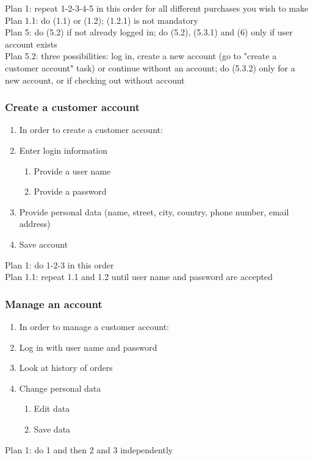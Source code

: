 Plan 1: repeat 1-2-3-4-5 in this order for all different purchases you wish to make\\
Plan 1.1: do (1.1) or (1.2); (1.2.1) is not mandatory\\
Plan 5: do (5.2) if not already logged in; do (5.2), (5.3.1) and (6) only if user account exists\\
Plan 5.2: three possibilities: log in, create a new account (go to "create a customer account" task) or continue without an account; do (5.3.2) only for a new account, or if checking out without account

\subsubsection{Create a customer account}
\begin{enumerate}[label*=\arabic*.,start=0,itemsep=-4pt]
  \item In order to create a customer account:
  \item Enter login information
  \begin{enumerate}[label*=\arabic*.,itemsep=-4pt]
		\item Provide a user name
		\item Provide a password
	\end{enumerate}
  \item Provide personal data (name, street, city, country, phone number, email address)
  \item Save account
\end{enumerate}
Plan 1: do 1-2-3 in this order\\
Plan 1.1: repeat 1.1 and 1.2 until user name and password are accepted

\subsubsection{Manage an account}
\begin{enumerate}[label*=\arabic*.,start=0,itemsep=-4pt]
  \item In order to manage a customer account:
  \item Log in with user name and password
  \item Look at history of orders
  \item Change personal data
    \begin{enumerate}[label*=\arabic*.,itemsep=-4pt]
      \item Edit data
      \item Save data
    \end{enumerate}
\end{enumerate}
Plan 1: do 1 and then 2 and 3 independently


